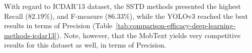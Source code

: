 With regard to ICDAR'13 dataset, the SSTD methods presented the highest Recall ($82.19\%$), and F-measure ($86.33\%$), while the YOLOv3 reached the best results in terms of Precision (Table~\ref{tab:comparison-efficacy-deep-learning-methods-icdar13}). Note, however, that the MobText yields very competitive results for this dataset as well, in terms of Precision. 
%
\begin{table}[!h]
    \centering
    \caption{Comparison of effectiveness among the evaluated deep learning-based methods for the ICDAR'13 dataset.}
    \label{tab:comparison-efficacy-deep-learning-methods-icdar13}
\end{table}
%
